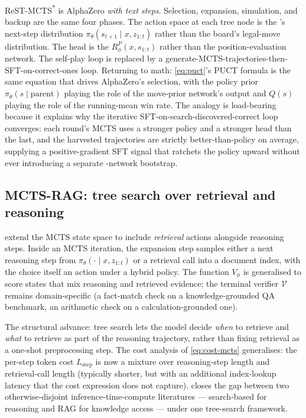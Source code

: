 \begin{analogy}
ReST-MCTS\textsuperscript{*} is AlphaZero \emph{with text steps}.
Selection, expansion, simulation, and backup are the same four phases.
The action space at each tree node is the 's next-step distribution
$\pi_\theta(s_{t+1} \mid x, z_{1:t})$ rather than the board's
legal-move distribution. The  head is the 
$R^P_\phi(x, s_{1:t})$ rather than the position-evaluation network.
The self-play loop is replaced by a
generate-MCTS-trajectories-then-SFT-on-correct-ones loop. Returning to
math: \cref{eq:puct}'s PUCT formula is the same equation that drives
AlphaZero's selection, with the policy prior
$\pi_\theta(s \mid \text{parent})$ playing the role of the
move-prior network's output and $Q(s)$ playing the role of the
running-mean win rate. The analogy is load-bearing because it
explains why the iterative SFT-on-search-discovered-correct loop
converges: each round's MCTS uses a stronger policy and a stronger
 head than the last, and the harvested trajectories are
strictly better-than-policy on average, supplying a positive-gradient
SFT signal that ratchets the policy upward without ever introducing
a separate -network bootstrap.
\end{analogy}

\subsection{MCTS-RAG: tree search over retrieval and reasoning}
\label{sec:tree-mcts-rag}

\citet{hu2025-mcts-rag} extend the MCTS state space to include
\emph{retrieval} actions alongside reasoning
steps. Inside an MCTS iteration, the
expansion step samples either a next reasoning step from
$\pi_\theta(\cdot \mid x, z_{1:t})$ or a retrieval call into a
document index, with the choice itself an action under a hybrid
policy. The  function $V_\phi$ is generalised to score states
that mix reasoning and retrieved evidence; the terminal verifier
$\mathcal{V}$ remains domain-specific (a fact-match check on a
knowledge-grounded QA benchmark, an arithmetic check on a
calculation-grounded one).

The structural advance: tree search lets the model decide
\emph{when} to retrieve and \emph{what} to retrieve as part of the
reasoning trajectory, rather than fixing retrieval as a one-shot
preprocessing step. The cost analysis of \cref{eq:cost-mcts}
generalises: the per-step token cost $L_\text{step}$ is now a mixture
over reasoning-step length and retrieval-call length (typically
shorter, but with an additional index-lookup latency that the cost
expression does not capture).  closes the gap between two
otherwise-disjoint inference-time-compute literatures --- search-based
 for reasoning and RAG for knowledge access --- under one
tree-search framework.


